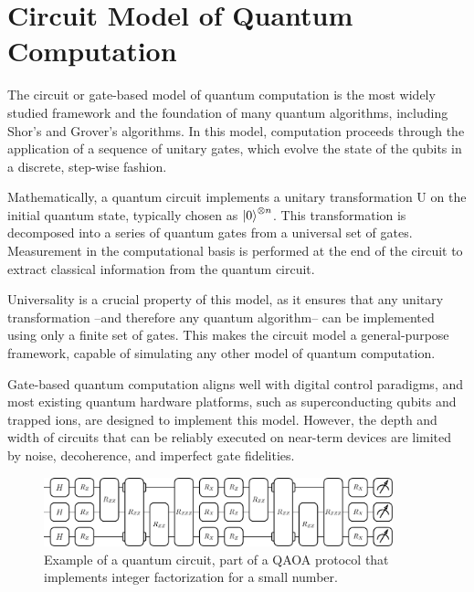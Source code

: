 \section{Circuit Model of Quantum Computation}
\label{Section:GateModelQC}

The circuit or gate-based model of quantum computation is the most widely studied
framework and the foundation of many quantum algorithms, including Shor's and Grover's
algorithms. In this model, computation proceeds through the application of a sequence
of unitary gates, which evolve the state of the qubits in a discrete, step-wise fashion.

Mathematically, a quantum circuit implements a unitary transformation U on the initial
quantum state, typically chosen as $\ket{0}^{\otimes n}$. This transformation is
decomposed into a series of quantum gates from a universal set of gates. Measurement in
the computational basis is performed at the end of the circuit to extract classical
information from the quantum circuit.

Universality is a crucial property of this model, as it ensures that any unitary transformation --and
therefore any quantum algorithm-- can be implemented using only a finite set of gates. This makes the
circuit model a general-purpose framework, capable of simulating any other model of quantum computation.

Gate-based quantum computation aligns well with digital control paradigms, and most
existing quantum hardware platforms, such as superconducting qubits and trapped ions, are
designed to implement this model. However, the depth and width of circuits that can be
reliably executed on near-term devices are limited by noise, decoherence, and imperfect
gate fidelities.

\begin{figure}[h]
    \centering
    \includegraphics[width=0.9\textwidth]{01-introduction/figs/example_circuit.pdf}
    \caption{Example of a quantum circuit, part of a QAOA protocol that implements integer factorization for a small number.}
    \label{fig:example_circuit}
\end{figure}